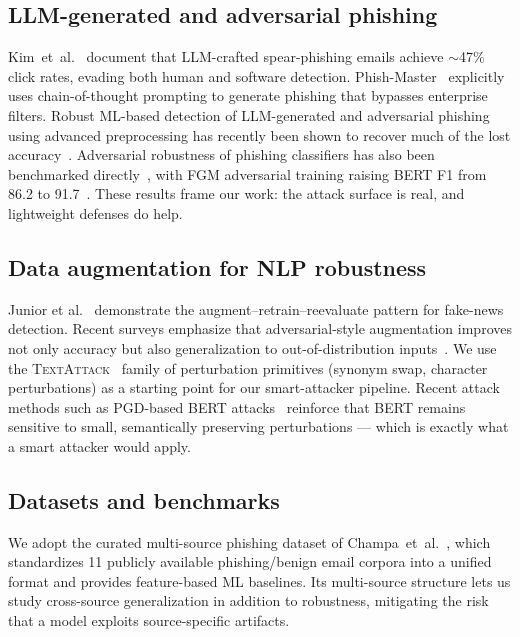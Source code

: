 \documentclass[conference]{IEEEtran}
\begin{document}
\subsection{LLM-generated and adversarial phishing}
Kim~et~al.~\cite{kim2025llms} document that LLM-crafted spear-phishing emails
achieve $\sim$47\% click rates, evading both human and software detection.
Phish-Master~\cite{phishmaster2025} explicitly uses chain-of-thought prompting
to generate phishing that bypasses enterprise filters. Robust ML-based
detection of LLM-generated and adversarial phishing using advanced
preprocessing has recently been shown to recover much of the lost
accuracy~\cite{robustllmphish2025}. Adversarial robustness of phishing
classifiers has also been benchmarked
directly~\cite{adversarialphishing2023,explainabletransformer2025}, with FGM
adversarial training raising BERT F1 from 86.2 to
91.7~\cite{explainabletransformer2025}. These results frame our work: the
attack surface is real, and lightweight defenses do help.

\subsection{Data augmentation for NLP robustness}
Junior et al.~\cite{junior2022dataaug} demonstrate the
augment--retrain--reevaluate pattern for fake-news detection. Recent surveys
emphasize that adversarial-style augmentation improves not only accuracy but
also generalization to out-of-distribution
inputs~\cite{textaugsurvey2025}. We use the
\textsc{TextAttack}~\cite{textattack2020} family of perturbation primitives
(synonym swap, character perturbations) as a starting point for our
smart-attacker pipeline. Recent attack methods such as PGD-based BERT
attacks~\cite{pgdbertattack2024} reinforce that BERT remains sensitive to
small, semantically preserving perturbations --- which is exactly what a
smart attacker would apply.

\subsection{Datasets and benchmarks}
We adopt the curated multi-source phishing dataset of
Champa~et~al.~\cite{champa2024curated}, which standardizes 11 publicly
available phishing/benign email corpora into a unified format and provides
feature-based ML baselines. Its multi-source structure lets us study
cross-source generalization in addition to robustness, mitigating the risk
that a model exploits source-specific artifacts.
\end{document}
